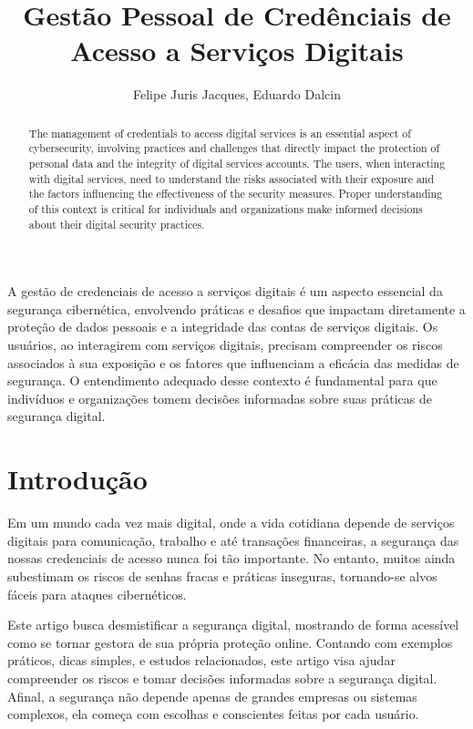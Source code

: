 \documentclass[12pt]{article}
\title{Gestão Pessoal de Credênciais de Acesso a Serviços Digitais}
\author{Felipe Juris Jacques\inst{1}, Eduardo Dalcin\inst{1} }
\begin{document}
 

\maketitle

\begin{abstract}
  The management of credentials to access digital services is an essential aspect
  of cybersecurity, involving practices and challenges that directly impact the
  protection of personal data and the integrity of digital services accounts.
  The users, when interacting with digital services, need to understand the
  risks associated with their exposure and the factors influencing the
  effectiveness of the security measures.
  Proper understanding of this context is critical for individuals and
  organizations make informed decisions about their digital security practices.
\end{abstract}
     
\begin{resumo}
  A gestão de credenciais de acesso a serviços digitais é um aspecto essencial da
  segurança cibernética, envolvendo práticas e desafios que impactam diretamente
  a proteção de dados pessoais e a integridade das contas de serviços digitais.
  Os usuários, ao interagirem com serviços digitais, precisam compreender os
  riscos associados à sua exposição e os fatores que influenciam a eficácia das
  medidas de segurança.
  O entendimento adequado desse contexto é fundamental para que indivíduos e
  organizações tomem decisões informadas sobre suas práticas de segurança digital.
\end{resumo}

\section{Introdução}

Em um mundo cada vez mais digital, onde a vida cotidiana depende de serviços digitais
para comunicação, trabalho e até transações financeiras, a segurança das nossas
credenciais de acesso nunca foi tão importante.
No entanto, muitos ainda subestimam os riscos de senhas fracas e práticas inseguras,
tornando-se alvos fáceis para ataques cibernéticos.

Este artigo busca desmistificar a segurança digital, mostrando de forma acessível como
se tornar gestora de sua própria proteção online.
Contando com exemplos práticos, dicas simples, e estudos relacionados, este artigo
visa ajudar compreender os riscos e tomar decisões informadas sobre a segurança digital.
Afinal, a segurança não depende apenas de grandes empresas ou sistemas complexos,
ela começa com escolhas e conscientes feitas por cada usuário.
\end{document}
